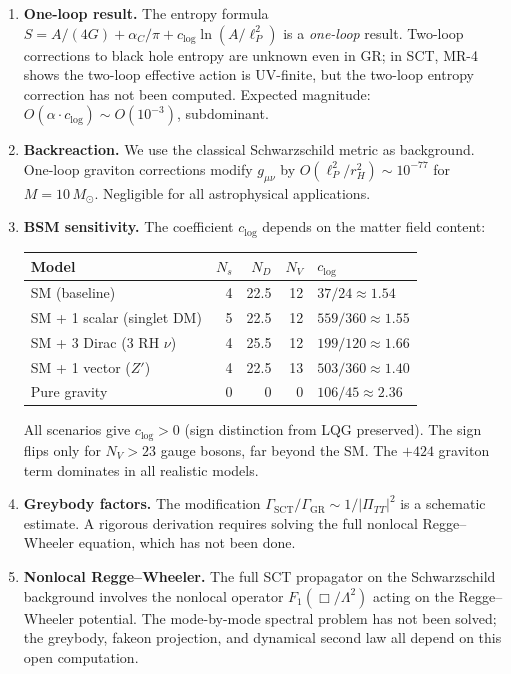 \documentclass[11pt,a4paper]{article}
\theoremstyle{plain}
\theoremstyle{definition}
\begin{document}
\begin{enumerate}
  \item \textbf{One-loop result.}
    The entropy formula $S = A/(4G) + \alpha_C/\pi + c_{\log}\ln(A/\ell_P^2)$
    is a \emph{one-loop} result.  Two-loop corrections to black hole entropy
    are unknown even in GR; in SCT, MR-4 shows the two-loop effective action
    is UV-finite, but the two-loop entropy correction has not been computed.
    Expected magnitude: $O(\alpha \cdot c_{\log}) \sim O(10^{-3})$, subdominant.

  \item \textbf{Backreaction.}
    We use the classical Schwarzschild metric as background.
    One-loop graviton corrections modify $g_{\mu\nu}$ by
    $O(\ell_P^2/r_H^2) \sim 10^{-77}$ for $M = 10\,M_\odot$.
    Negligible for all astrophysical applications.

  \item \textbf{BSM sensitivity.}
    The coefficient $c_{\log}$ depends on the matter field content:
    \begin{center}
    \small
    \begin{tabular}{lrrrl}
    \toprule
    Model & $N_s$ & $N_D$ & $N_V$ & $c_{\log}$ \\
    \midrule
    SM (baseline) & 4 & 22.5 & 12 & $37/24 \approx 1.54$ \\
    SM + 1 scalar (singlet DM) & 5 & 22.5 & 12 & $559/360 \approx 1.55$ \\
    SM + 3 Dirac (3 RH $\nu$) & 4 & 25.5 & 12 & $199/120 \approx 1.66$ \\
    SM + 1 vector ($Z'$) & 4 & 22.5 & 13 & $503/360 \approx 1.40$ \\
    Pure gravity & 0 & 0 & 0 & $106/45 \approx 2.36$ \\
    \bottomrule
    \end{tabular}
    \end{center}
    All scenarios give $c_{\log} > 0$ (sign distinction from LQG preserved).
    The sign flips only for $N_V > 23$ gauge bosons, far beyond the SM.
    The $+424$ graviton term dominates in all realistic models.

  \item \textbf{Greybody factors.}
    The modification $\Gamma_{\mathrm{SCT}}/\Gamma_{\mathrm{GR}}
    \sim 1/|\Pi_{TT}|^2$ is a schematic estimate.
    A rigorous derivation requires solving the full nonlocal
    Regge--Wheeler equation, which has not been done.

  \item \textbf{Nonlocal Regge--Wheeler.}
    The full SCT propagator on the Schwarzschild background
    involves the nonlocal operator $F_1(\Box/\Lambda^2)$ acting
    on the Regge--Wheeler potential.  The mode-by-mode spectral
    problem has not been solved; the greybody, fakeon projection,
    and dynamical second law all depend on this open computation.
\end{enumerate}
\end{document}
